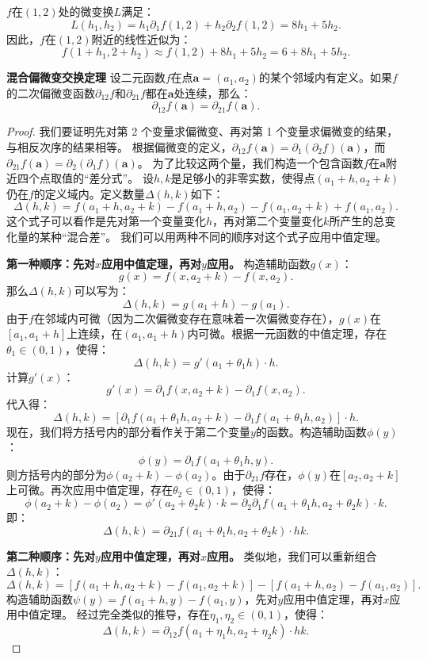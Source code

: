 \documentclass[12pt,UTF8]{ctexbook}
\begin{document}
\begin{appendix}
\begin{so}
$f$在$(1,2)$处的微变换$L$满足：
$$ L(h_1,h_2) = h_1\partial_1 f(1,2) + h_2\partial_2 f(1,2) = 8h_1 + 5h_2. $$
因此，$f$在$(1,2)$附近的线性近似为：
$$ f(1+h_1,2+h_2) \approx f(1,2) + 8h_1 + 5h_2 = 6 + 8h_1 + 5h_2. $$
\end{so}

\begin{tm}{\textbf{混合偏微变交换定理}}
设二元函数$f$在点$\mathbf{a}=(a_1, a_2)$的某个邻域内有定义。如果$f$的二次偏微变函数$\partial_{12} f$和$\partial_{21} f$都在$\mathbf{a}$处连续，那么：
$$ \partial_{12} f(\mathbf{a}) = \partial_{21} f(\mathbf{a}). $$
\end{tm}
\begin{proof}
我们要证明先对第 2 个变量求偏微变、再对第 1 个变量求偏微变的结果，与相反次序的结果相等。
根据偏微变的定义，$\partial_{12} f(\mathbf{a}) = \partial_1 (\partial_2 f)(\mathbf{a})$，而$\partial_{21} f(\mathbf{a}) = \partial_2 (\partial_1 f)(\mathbf{a})$。
为了比较这两个量，我们构造一个包含函数$f$在$\mathbf{a}$附近四个点取值的“差分式”。
设$h, k$是足够小的非零实数，使得点$(a_1+h, a_2+k)$仍在$f$的定义域内。定义数量$\Delta(h, k)$如下：
$$ \Delta(h, k) = f(a_1+h, a_2+k) - f(a_1+h, a_2) - f(a_1, a_2+k) + f(a_1, a_2). $$
这个式子可以看作是先对第一个变量变化$h$，再对第二个变量变化$k$所产生的总变化量的某种“混合差”。
我们可以用两种不同的顺序对这个式子应用中值定理。

\textbf{第一种顺序：先对$x$应用中值定理，再对$y$应用。}
构造辅助函数$g(x)$：
$$ g(x) = f(x, a_2+k) - f(x, a_2). $$
那么$\Delta(h, k)$可以写为：
$$ \Delta(h, k) = g(a_1+h) - g(a_1). $$
由于$f$在邻域内可微（因为二次偏微变存在意味着一次偏微变存在），$g(x)$在$[a_1, a_1+h]$上连续，在$(a_1, a_1+h)$内可微。根据一元函数的中值定理，存在$\theta_1 \in (0, 1)$，使得：
$$ \Delta(h, k) = g'(a_1 + \theta_1 h) \cdot h. $$
计算$g'(x)$：
$$ g'(x) = \partial_1 f(x, a_2+k) - \partial_1 f(x, a_2). $$
代入得：
$$ \Delta(h, k) = \left[ \partial_1 f(a_1 + \theta_1 h, a_2+k) - \partial_1 f(a_1 + \theta_1 h, a_2) \right] \cdot h. $$
现在，我们将方括号内的部分看作关于第二个变量$y$的函数。构造辅助函数$\phi(y)$：
$$ \phi(y) = \partial_1 f(a_1 + \theta_1 h, y). $$
则方括号内的部分为$\phi(a_2+k) - \phi(a_2)$。由于$\partial_{21} f$存在，$\phi(y)$在$[a_2, a_2+k]$上可微。再次应用中值定理，存在$\theta_2 \in (0, 1)$，使得：
$$ \phi(a_2+k) - \phi(a_2) = \phi'(a_2 + \theta_2 k) \cdot k = \partial_2 \partial_1 f(a_1 + \theta_1 h, a_2 + \theta_2 k) \cdot k. $$
即：
$$ \Delta(h, k) = \partial_{21} f(a_1 + \theta_1 h, a_2 + \theta_2 k) \cdot h k. $$

\textbf{第二种顺序：先对$y$应用中值定理，再对$x$应用。}
类似地，我们可以重新组合$\Delta(h, k)$：
$$ \Delta(h, k) = \left[ f(a_1+h, a_2+k) - f(a_1, a_2+k) \right] - \left[ f(a_1+h, a_2) - f(a_1, a_2) \right]. $$
构造辅助函数$\psi(y) = f(a_1+h, y) - f(a_1, y)$，先对$y$应用中值定理，再对$x$应用中值定理。
经过完全类似的推导，存在$\eta_1, \eta_2 \in (0, 1)$，使得：
$$ \Delta(h, k) = \partial_{12} f(a_1 + \eta_1 h, a_2 + \eta_2 k) \cdot h k. $$


\end{proof}
\end{appendix}
\end{document}

